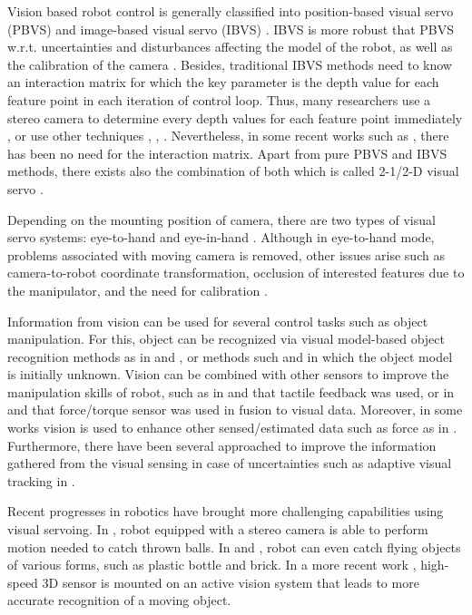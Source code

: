 Vision based robot control is generally classified into position-based visual servo (PBVS) and image-based visual servo (IBVS) \cite{janabi2011comparison}. IBVS is more robust that PBVS w.r.t. uncertainties and disturbances affecting the model of the robot, as well as the calibration of the camera \cite{malis2003robustness}. Besides, traditional IBVS methods need to know an interaction matrix for which the key parameter is  the depth value for each feature point in each iteration of control loop. Thus, many researchers use a stereo camera to determine every depth values for each feature point immediately \cite{wang2014modified}, or use other techniques \cite{luo2014hybrid}, \cite{zhong2015robots}, \cite{kosmopoulos2011robust}. Nevertheless, in some recent works such as \cite{tongloy2016image}, there has been no need for the interaction matrix. Apart from pure PBVS and IBVS methods, there exists also the combination of both which is called 2-1/2-D visual servo \cite{malis19992}. \par 
Depending on the mounting position of camera, there are two types of visual servo systems: eye-to-hand and eye-in-hand \cite{dong2015position}. Although in eye-to-hand mode, problems associated with moving camera is removed, other issues arise such as camera-to-robot coordinate transformation, occlusion of interested features due to the manipulator, and the need for calibration \cite{smith1996vision}. \par 
Information from vision can be used for several control tasks such as object manipulation. For this, object can be recognized via visual model-based object recognition methods as in \cite{nuchter2008towards} and \cite{lee2008toward}, or methods such \cite{yamazaki2006grasp} and \cite{ohno2011unknown} in which the object model is initially unknown. Vision can be combined with other sensors to improve the manipulation skills of robot, such as in \cite{bimbo2013combining} and \cite{li2013integrating} that tactile feedback was used, or in \cite{prats2009vision} and \cite{hebert2011fusion} that force/torque sensor was used in fusion to visual data. Moreover, in some works vision is used to enhance other sensed/estimated data such as force as in \cite{pham2015towards}. Furthermore, there have been several approached to improve the information gathered from the visual sensing in case of uncertainties such as adaptive visual tracking in \cite{wang2015adaptive}.  \par 
Recent progresses in robotics have brought more challenging capabilities using visual servoing. In \cite{bauml2011catching}, robot equipped with a stereo camera is able to perform motion needed to catch thrown balls. In \cite{kim2014catching} and \cite{salehian2016dynamical}, robot can even catch flying objects of various forms, such as plastic bottle and brick. In a more recent work \cite{shimada2016high}, high-speed 3D sensor is mounted on an active vision system that leads to more accurate recognition of a moving object. \par 

